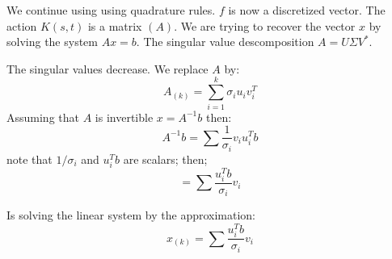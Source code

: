 We continue using using quadrature rules. $f$ is now a discretized vector. The action $K(s,t)$ is a matrix $(A)$. We are trying to recover the vector $x$ by solving the system $Ax=b$. The singular value descomposition $A=U\Sigma V^*$.

The singular values decrease. We replace $A$ by:
$$A_{(k)} = \sum_{i=1}^k \sigma_i u_i v_i^T$$
Assuming that $A$ is invertible $x=A^{-1} b$ then:
$$A ^{-1} b = \sum \frac{1}{\sigma_i} v_i u_i^T b$$
note that $1/\sigma_i$ and $u_i^Tb$ are scalars; then;
$$=\sum \frac{u_i^Tb}{\sigma_i}v_i$$
\begin{ddef}
Is solving the linear system by the approximation:
$$x_{(k)}=\sum \frac{u_i^Tb}{\sigma_i}v_i$$
\end{ddef}
